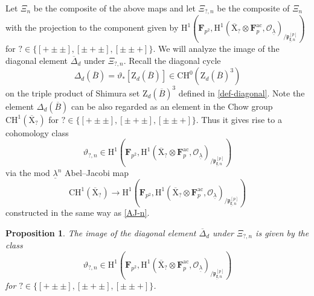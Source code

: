 \documentclass[10pt]{amsart}
\numberwithin{equation}{section}
\theoremstyle{plain}
\newtheorem{proposition}[theorem]{Proposition}
\numberwithin{equation}{section}
\theoremstyle{definition}
\theoremstyle{remark}
\def\ac{\mathrm{ac}}
\def\ac{\mathrm{ac}}
\def\undlamb{\underline{\lambda}}
\def\triplef{\underline{\mathbf{f}}}
\def\triplepnp {{\frakp}^{[p]}_{\triplef, n}}
\def\calO{\mathcal{O}}
\def\frakp{\mathfrak{p}}
\def\FF{\mathbf{F}}
\def\rmH{\mathrm{H}}
\def\rmX{\mathrm{X}}
\def\rmXbar{\overline{\rmX}}
\def\rmZ{\mathrm{Z}}
\begin{document}
Let $\Xi_{n}$ be the composite of the above maps and let $\Xi_{?, n}$ be the composite of $\Xi_{n}$ with the projection to the component given by $\rmH^{1}(\FF_{p^{2}}, \rmH^{1}(\rmXbar_{?}\otimes{\FF^{\ac}_{p}}, \calO_{\undlamb})_{/\triplepnp})$ for $?\in\{[+\pm\pm], [\pm+\pm], [\pm\pm+]\}$.  We will analyze the image of the diagonal element $\overline{\Delta}_{d}$ under $\Xi_{?, n}$.  Recall the diagonal cycle 
\begin{equation*}
\Delta_{d}(\overline{B})=\vartheta_{\ast}[\rmZ_{d}(\overline{B})]\in \mathrm{CH}^{0}(\rmZ_{d}(\overline{B})^{3})
\end{equation*}
on the triple product of Shimura set $\rmZ_{d}(\overline{B})^{3}$ defined in \ref{def-diagonal}. Note the element $\Delta_{d}(\overline{B})$ can be also regarded as an element in the Chow group $\mathrm{CH}^{1}(\rmXbar_{?})$ for $?\in\{[+\pm\pm], [\pm+\pm], [\pm\pm+]\}$. Thus it gives rise to a cohomology class
\begin{equation*}
\vartheta_{?, n}\in  \rmH^{1}(\FF_{p^{2}}, \rmH^{1}(\rmXbar_{?}\otimes{\FF^{\ac}_{p}}, \calO_{\undlamb})_{/\triplepnp})
\end{equation*}
via the mod $\undlamb^{n}$ Abel--Jacobi map 
\begin{equation*}
\mathrm{CH}^{1}(\rmXbar_{?})\rightarrow\rmH^{1}(\FF_{p^{2}}, \rmH^{1}(\rmXbar_{?}\otimes{\FF^{\ac}_{p}}, \calO_{\undlamb})_{/\triplepnp}) 
\end{equation*}
constructed in the same way as \ref{AJ-n}.
\begin{proposition}\label{ss-diagonal}
The image of the diagonal element  $\overline{\Delta}_{d}$ under $\Xi_{?, n}$ is given by the class
\begin{equation*}
\vartheta_{?, n}\in  \rmH^{1}(\FF_{p^{2}}, \rmH^{1}(\rmXbar_{?}\otimes{\FF^{\ac}_{p}}, \calO_{\undlamb})_{/\triplepnp})
\end{equation*}
for $?\in \{[+\pm\pm], [\pm+\pm], [\pm\pm+]\}$.
\end{proposition}
\end{document}
